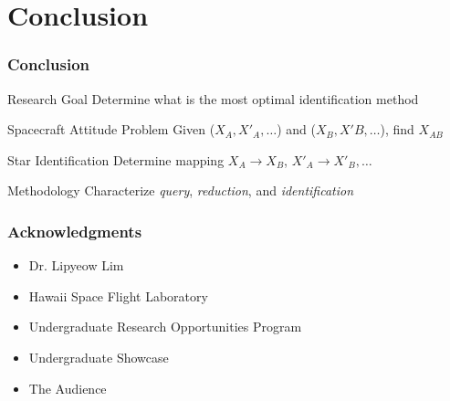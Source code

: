 \documentclass[11pt]{beamer}
\begin{document}
    \section{Conclusion}\label{sec:conclusion}
    \begin{frame}
        \frametitle{Conclusion}
        \begin{block}{Research Goal}
            Determine what is the most optimal identification method
        \end{block} \medskip
        \begin{block}{Spacecraft Attitude Problem}
            Given ($X_A, X'_A, \ldots$) and ($X_B, X'B, \ldots$), find $X_{AB}$
        \end{block} \medskip
        \begin{block}{Star Identification}
            Determine mapping $X_A \rightarrow X_B$, $X'_A \rightarrow X'_B, \ldots$
        \end{block} \medskip
        \begin{block}{Methodology}
            Characterize \textit{query}, \textit{reduction}, and \textit{identification}
        \end{block}
    \end{frame}

    \begin{frame}
        \frametitle{Acknowledgments}
        \begin{itemize}
            \item Dr. Lipyeow Lim \medskip
            \item Hawaii Space Flight Laboratory \medskip
            \item Undergraduate Research Opportunities Program \medskip
            \item Undergraduate Showcase \medskip
            \item The Audience \medskip
        \end{itemize}
    \end{frame}

    \begin{frame}
    \end{frame}
\end{document}

